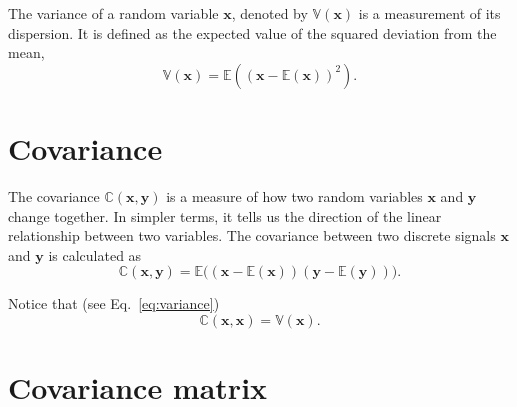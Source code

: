 The variance of a random variable $\mathbf{x}$, denoted by
$\mathbb{V}(\mathbf{x})$ is a measurement of its dispersion. It is
defined as the expected value of the squared deviation from the mean,
\begin{equation}
  \mathbb{V}(\mathbf{x}) = \mathbb{E}\left((\mathbf{x} - \mathbb{E}(\mathbf{x}))^2 \right).
  \label{eq:variance}
\end{equation}


\section{Covariance}
\label{sec:covariance}

The covariance $\mathbb{C}(\mathbf{x}, \mathbf{y})$ is a measure of
how two random variables $\mathbf{x}$ and $\mathbf{y}$ change
together. In simpler terms, it tells us the direction of the linear
relationship between two variables. The covariance between two
discrete signals $\mathbf{x}$ and $\mathbf{y}$ is calculated as
\begin{equation}
  \mathbb{C}(\textbf{x}, \textbf{y}) = \mathbb{E}\big((\mathbf{x}-\mathbb{E}(\mathbf{x}))(\mathbf{y}-\mathbb{E}(\mathbf{y}))\big).
\end{equation}

Notice that (see Eq.~\ref{eq:variance})
\begin{equation}
  \mathbb{C}(\mathbf{x}, \mathbf{x}) = \mathbb{V}(\mathbf{x}).
\end{equation}


\section{Covariance matrix}
\label{sec:covariance_matrix}

